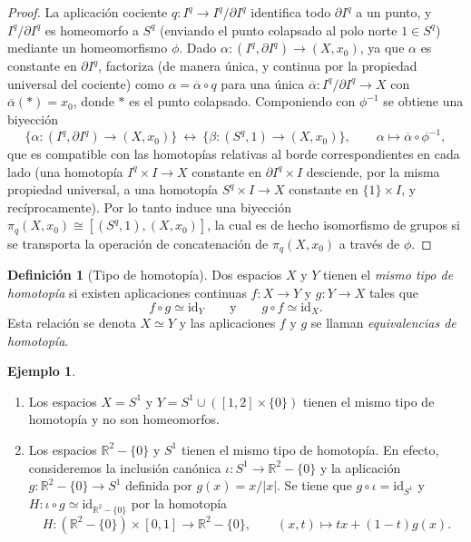 \documentclass[11pt,a4paper]{article}
\theoremstyle{plain}
\theoremstyle{definition}
\newtheorem{definition}[theorem]{Definición}
\newtheorem{example}[theorem]{Ejemplo}
\theoremstyle{remark}
\newcommand{\RR}{\mathbb R}
\begin{document}
\begin{proof}
La aplicación cociente $q:I^q\to I^q/\partial I^q$ identifica todo
$\partial I^q$ a un punto, y $I^q/\partial I^q$ es homeomorfo a $S^q$
(enviando el punto colapsado al polo norte $1\in S^q$) mediante un
homeomorfismo $\phi$. Dado $\alpha:(I^q,\partial I^q)\to(X,x_0)$, ya que
$\alpha$ es constante en $\partial I^q$, factoriza (de manera única, y
continua por la propiedad universal del cociente) como
$\alpha=\overline\alpha\circ q$ para una única $\overline\alpha:I^q/\partial I^q\to X$
con $\overline\alpha(\ast)=x_0$, donde $\ast$ es el punto colapsado.
Componiendo con $\phi^{-1}$ se obtiene una biyección
\[
\{\alpha:(I^q,\partial I^q)\to(X,x_0)\}\ \longleftrightarrow\ \{\beta:(S^q,1)\to(X,x_0)\}, \qquad \alpha\mapsto\overline\alpha\circ\phi^{-1},
\]
que es compatible con las homotopías relativas al borde correspondientes
en cada lado (una homotopía $I^q\times I\to X$ constante en
$\partial I^q\times I$ desciende, por la misma propiedad universal, a una
homotopía $S^q\times I\to X$ constante en $\{1\}\times I$, y
recíprocamente). Por lo tanto induce una biyección
$\pi_q(X,x_0)\cong[(S^q,1),(X,x_0)]$, la cual es de hecho isomorfismo de
grupos si se transporta la operación de concatenación de
$\pi_q(X,x_0)$ a través de $\phi$.
\end{proof}

\begin{definition}[Tipo de homotopía]
\label{def:tipo-homotopia}
Dos espacios $X$ y $Y$ tienen el \emph{mismo tipo de homotopía} si existen
aplicaciones continuas $f:X\to Y$ y $g:Y\to X$ tales que
\[
f\circ g\simeq\mathrm{id}_Y \qquad\text{y}\qquad g\circ f\simeq\mathrm{id}_X.
\]
Esta relación se denota $X\simeq Y$ y las aplicaciones $f$ y $g$ se llaman
\emph{equivalencias de homotopía}.
\end{definition}

\begin{example}
\label{ex:tipo-homotopia}
\
\begin{enumerate}[label=\arabic*.]
\item Los espacios $X=S^1$ y $Y=S^1\cup([1,2]\times\{0\})$ tienen el mismo
tipo de homotopía y no son homeomorfos.
\item Los espacios $\RR^2-\{0\}$ y $S^1$ tienen el mismo tipo de homotopía.
En efecto, consideremos la inclusión canónica $\iota:S^1\to\RR^2-\{0\}$ y la
aplicación $g:\RR^2-\{0\}\to S^1$ definida por $g(x)=x/|x|$. Se tiene que
$g\circ\iota=\mathrm{id}_{S^1}$ y $H:\iota\circ g\simeq\mathrm{id}_{\RR^2-\{0\}}$
por la homotopía
\[
H:(\RR^2-\{0\})\times[0,1]\to\RR^2-\{0\}, \qquad (x,t)\mapsto tx+(1-t)g(x).
\]
\end{enumerate}
\end{example}
\end{document}
